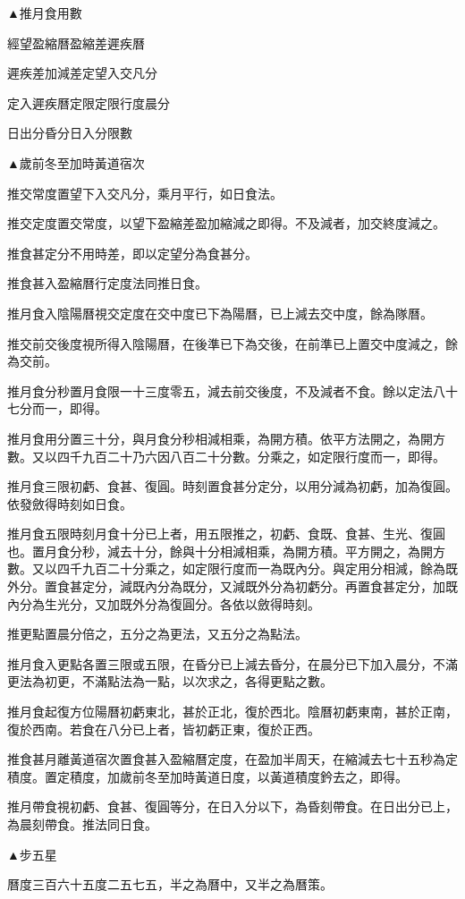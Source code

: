 ▲推月食用數

經望盈縮曆盈縮差遲疾曆

遲疾差加減差定望入交凡分

定入遲疾曆定限定限行度晨分

日出分昏分日入分限數

▲歲前冬至加時黃道宿次

推交常度置望下入交凡分，乘月平行，如日食法。

推交定度置交常度，以望下盈縮差盈加縮減之即得。不及減者，加交終度減之。

推食甚定分不用時差，即以定望分為食甚分。

推食甚入盈縮曆行定度法同推日食。

推月食入陰陽曆視交定度在交中度已下為陽曆，已上減去交中度，餘為隊曆。

推交前交後度視所得入陰陽曆，在後準已下為交後，在前準已上置交中度減之，餘為交前。

推月食分秒置月食限一十三度零五，減去前交後度，不及減者不食。餘以定法八十七分而一，即得。

推月食用分置三十分，與月食分秒相減相乘，為開方積。依平方法開之，為開方數。又以四千九百二十乃六因八百二十分數。分乘之，如定限行度而一，即得。

推月食三限初虧、食甚、復圓。時刻置食甚分定分，以用分減為初虧，加為復圓。依發斂得時刻如日食。

推月食五限時刻月食十分已上者，用五限推之，初虧、食既、食甚、生光、復圓也。置月食分秒，減去十分，餘與十分相減相乘，為開方積。平方開之，為開方數。又以四千九百二十分乘之，如定限行度而一為既內分。與定用分相減，餘為既外分。置食甚定分，減既內分為既分，又減既外分為初虧分。再置食甚定分，加既內分為生光分，又加既外分為復圓分。各依以斂得時刻。

推更點置晨分倍之，五分之為更法，又五分之為點法。

推月食入更點各置三限或五限，在昏分已上減去昏分，在晨分已下加入晨分，不滿更法為初更，不滿點法為一點，以次求之，各得更點之數。

推月食起復方位陽曆初虧東北，甚於正北，復於西北。陰曆初虧東南，甚於正南，復於西南。若食在八分已上者，皆初虧正東，復於正西。

推食甚月離黃道宿次置食甚入盈縮曆定度，在盈加半周天，在縮減去七十五秒為定積度。置定積度，加歲前冬至加時黃道日度，以黃道積度鈐去之，即得。

推月帶食視初虧、食甚、復圓等分，在日入分以下，為昏刻帶食。在日出分已上，為晨刻帶食。推法同日食。

▲步五星

曆度三百六十五度二五七五，半之為曆中，又半之為曆策。

